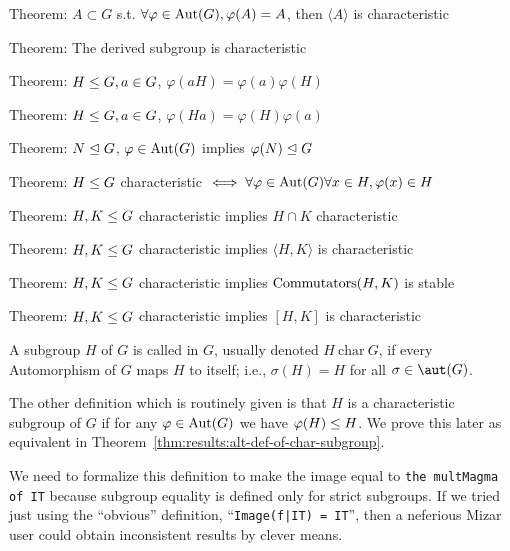 \LA{}Theorem: $A\subset G$ s.t. $\forall\varphi\in\operatorname{Aut}(G),\varphi(A)=A$, then $\langle A\rangle$ is characteristic~{\nwtagstyle{}}\RA{}

\LA{}Theorem: The derived subgroup is characteristic~{\nwtagstyle{}}\RA{}

\LA{}Theorem: $H\leq G, a\in G$, $\varphi(aH)=\varphi(a)\varphi(H)$~{\nwtagstyle{}}\RA{}

\LA{}Theorem: $H\leq G, a\in G$, $\varphi(Ha)=\varphi(H)\varphi(a)$~{\nwtagstyle{}}\RA{}

\LA{}Theorem: $N\trianglelefteq G$, $\varphi\in\operatorname{Aut}(G)$ implies $\varphi(N)\trianglelefteq G$~{\nwtagstyle{}}\RA{}

\LA{}Theorem: $H\leq G$ characteristic $\iff\forall\varphi\in\operatorname{Aut}(G)\forall x\in H,\varphi(x)\in H$~{\nwtagstyle{}}\RA{}

\LA{}Theorem: $H,K\leq G$ characteristic implies $H\cap K$ characteristic~{\nwtagstyle{}}\RA{}

\LA{}Theorem: $H,K\leq G$ characteristic implies $\langle H, K\rangle$ is characteristic~{\nwtagstyle{}}\RA{}

\LA{}Theorem: $H,K\leq G$ characteristic implies ${\rm Commutators}(H,K)$ is stable~{\nwtagstyle{}}\RA{}

\LA{}Theorem: $H,K\leq G$ characteristic implies $[H,K]$ is characteristic~{\nwtagstyle{}}\RA{}
\nwendcode{}\nwdocspar

\begin{definition}\label{defn:characteristic:results:characteristic-subgroup}
A subgroup $H$ of $G$ is called  in $G$, usually
denoted $H~\mathrm{char}~G$, if every Automorphism of $G$ maps $H$ to
itself; i.e., $\sigma(H)=H$ for all $\sigma\in\aut(G)$.
\end{definition}

\begin{def-remark}
The other definition which is routinely given is that $H$ is a
characteristic subgroup of $G$ if for any $\varphi\in\operatorname{Aut}(G)$ we have
$\varphi(H)\leq H$. We prove this later as equivalent in Theorem~\ref{thm:results:alt-def-of-char-subgroup}.
\end{def-remark}
\begin{def-remark}
We need to formalize this definition to make the image equal to
\lstinline{the multMagma of IT} because subgroup equality is defined
only for strict subgroups. If we tried just using the ``obvious''
definition, ``\lstinline{Image(f|IT) = IT}'', then a neferious Mizar
user could obtain inconsistent results by clever means.
\end{def-remark}

